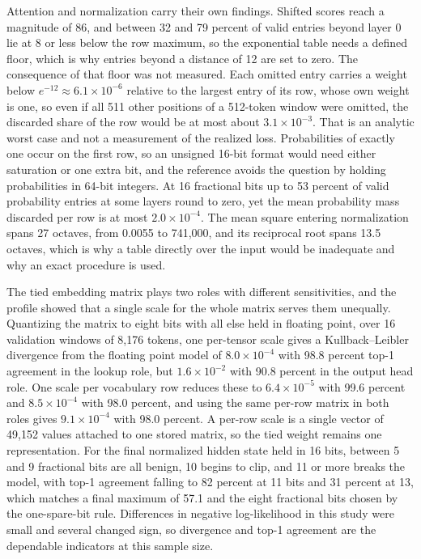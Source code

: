 \documentclass[11pt]{article}
\begin{document}
Attention and normalization carry their own findings. Shifted scores reach a magnitude of 86, and between 32 and 79 percent of valid entries beyond layer 0 lie at 8 or less below the row maximum, so the exponential table needs a defined floor, which is why entries beyond a distance of 12 are set to zero. The consequence of that floor was not measured. Each omitted entry carries a weight below $e^{-12}\approx6.1\times10^{-6}$ relative to the largest entry of its row, whose own weight is one, so even if all 511 other positions of a 512-token window were omitted, the discarded share of the row would be at most about $3.1\times10^{-3}$. That is an analytic worst case and not a measurement of the realized loss. Probabilities of exactly one occur on the first row, so an unsigned 16-bit format would need either saturation or one extra bit, and the reference avoids the question by holding probabilities in 64-bit integers. At 16 fractional bits up to 53 percent of valid probability entries at some layers round to zero, yet the mean probability mass discarded per row is at most $2.0\times10^{-4}$. The mean square entering normalization spans 27 octaves, from 0.0055 to 741,000, and its reciprocal root spans 13.5 octaves, which is why a table directly over the input would be inadequate and why an exact procedure is used.

The tied embedding matrix plays two roles with different sensitivities, and the profile showed that a single scale for the whole matrix serves them unequally. Quantizing the matrix to eight bits with all else held in floating point, over 16 validation windows of 8,176 tokens, one per-tensor scale gives a Kullback--Leibler divergence from the floating point model of $8.0\times10^{-4}$ with 98.8 percent top-1 agreement in the lookup role, but $1.6\times10^{-2}$ with 90.8 percent in the output head role. One scale per vocabulary row reduces these to $6.4\times10^{-5}$ with 99.6 percent and $8.5\times10^{-4}$ with 98.0 percent, and using the same per-row matrix in both roles gives $9.1\times10^{-4}$ with 98.0 percent. A per-row scale is a single vector of 49,152 values attached to one stored matrix, so the tied weight remains one representation. For the final normalized hidden state held in 16 bits, between 5 and 9 fractional bits are all benign, 10 begins to clip, and 11 or more breaks the model, with top-1 agreement falling to 82 percent at 11 bits and 31 percent at 13, which matches a final maximum of 57.1 and the eight fractional bits chosen by the one-spare-bit rule. Differences in negative log-likelihood in this study were small and several changed sign, so divergence and top-1 agreement are the dependable indicators at this sample size.
\end{document}
